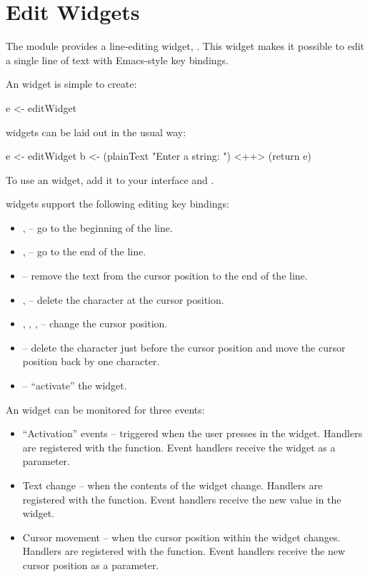 \section{Edit Widgets}

The  module provides a line-editing widget, .
This widget makes it possible to edit a single line of text with
Emacs-style key bindings.

An  widget is simple to create:

\begin{haskellcode}
 e <- editWidget
\end{haskellcode}

 widgets can be laid out in the usual way:

\begin{haskellcode}
 e <- editWidget
 b <- (plainText "Enter a string: ") <++> (return e)
\end{haskellcode}

To use an  widget, add it to your interface and
.

 widgets support the following editing key bindings:

\begin{itemize}
\item {},  -- go to the beginning of the line.
\item {},  -- go to the end of the line.
\item {} -- remove the text from the cursor position to the
  end of the line.
\item {},  -- delete the character at the cursor
  position.
\item {}, , ,  -- change the cursor
  position.
\item {} -- delete the character just before the cursor
  position and move the cursor position back by one character.
\item {} -- ``activate'' the  widget.
\end{itemize}

An  widget can be monitored for three events:

\begin{itemize}
\item ``Activation'' events -- triggered when the user presses
   in the  widget.  Handlers are registered with
  the  function.  Event handlers receive the 
  widget as a parameter.
\item Text change -- when the contents of the  widget change.
  Handlers are registered with the  function.  Event
  handlers receive the new  value in the  widget.
\item Cursor movement -- when the cursor position within the 
  widget changes.  Handlers are registered with the 
  function.  Event handlers receive the new cursor position as a
  parameter.
\end{itemize}

